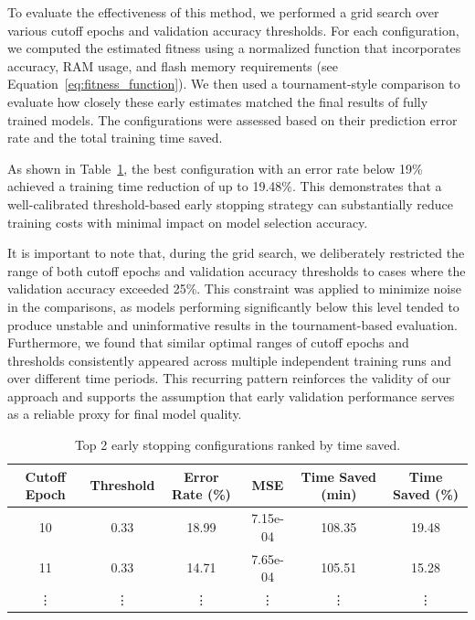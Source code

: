 To evaluate the effectiveness of this method, we performed a grid search over various cutoff epochs and validation accuracy thresholds. For each configuration, we computed the estimated fitness using a normalized function that incorporates accuracy, RAM usage, and flash memory requirements (see Equation~\ref{eq:fitness_function}). We then used a tournament-style comparison to evaluate how closely these early estimates matched the final results of fully trained models. The configurations were assessed based on their prediction error rate and the total training time saved.

As shown in Table~\ref{tab:early_stopping_results}, the best configuration with an error rate below 19\% achieved a training time reduction of up to 19.48\%. This demonstrates that a well-calibrated threshold-based early stopping strategy can substantially reduce training costs with minimal impact on model selection accuracy.

It is important to note that, during the grid search, we deliberately restricted the range of both cutoff epochs and validation accuracy thresholds to cases where the validation accuracy exceeded 25\%. This constraint was applied to minimize noise in the comparisons, as models performing significantly below this level tended to produce unstable and uninformative results in the tournament-based evaluation. Furthermore, we found that similar optimal ranges of cutoff epochs and thresholds consistently appeared across multiple independent training runs and over different time periods. This recurring pattern reinforces the validity of our approach and supports the assumption that early validation performance serves as a reliable proxy for final model quality.


\begin{table}[ht]
\centering
\begin{tabular}{cccccc}
\toprule
Cutoff Epoch & Threshold & Error Rate (\%) & MSE & Time Saved (min) & Time Saved (\%) \\
\midrule
10  & 0.33 & 18.99 & 7.15e-04 & 108.35 & 19.48 \\
11  & 0.33 & 14.71 & 7.65e-04 & 105.51 & 15.28 \\
\vdots & \vdots & \vdots & \vdots & \vdots & \vdots \\
\bottomrule
\end{tabular}
\caption{Top 2 early stopping configurations ranked by time saved.}
\label{tab:early_stopping_results}
\end{table}




